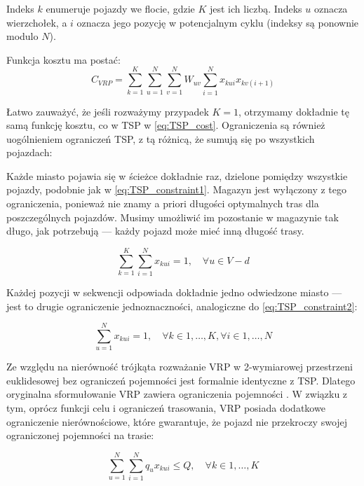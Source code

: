 Indeks $k$ enumeruje pojazdy we flocie, gdzie $K$ jest ich liczbą. Indeks $u$ oznacza wierzchołek, a $i$ oznacza jego pozycję w potencjalnym cyklu (indeksy są ponownie modulo $N$).

Funkcja kosztu ma postać:
\begin{equation}
C_{VRP} = \sum_{k=1}^K \sum_{u=1}^N \sum_{v=1}^N W_{uv} \sum_{i=1}^N x_{kui} x_{kv(i+1)}
\label{eq:VRP_cost}
\end{equation}

Łatwo zauważyć, że jeśli rozważymy przypadek $K=1$, otrzymamy dokładnie tę samą funkcję kosztu, co w TSP w \ref{eq:TSP_cost}. Ograniczenia są również uogólnieniem ograniczeń TSP, z tą różnicą, że sumują się po wszystkich pojazdach:

Każde miasto pojawia się w ścieżce dokładnie raz, dzielone pomiędzy wszystkie pojazdy, podobnie jak w \ref{eq:TSP_constraint1}. Magazyn jest wyłączony z tego ograniczenia, ponieważ nie znamy a priori długości optymalnych tras dla poszczególnych pojazdów. Musimy umożliwić im pozostanie w magazynie tak długo, jak potrzebują — każdy pojazd może mieć inną długość trasy.

\begin{equation}
\sum_{k=1}^{K} \sum_{i=1}^{N} x_{kui} = 1, \quad \forall u \in V - {d}
\label{eq:VRP_constraint1}
\end{equation}

Każdej pozycji w sekwencji odpowiada dokładnie jedno odwiedzone miasto — jest to drugie ograniczenie jednoznaczności, analogiczne do \ref{eq:TSP_constraint2}:

\begin{equation}
\sum_{u=1}^{N} x_{kui} = 1, \quad \forall k \in {1, \ldots, K}, \forall i \in {1, \ldots, N}
\label{eq:VRP_constraint2}
\end{equation}

Ze względu na nierówność trójkąta rozważanie VRP w 2-wymiarowej przestrzeni euklidesowej bez ograniczeń pojemności jest formalnie identyczne z TSP. Dlatego oryginalna sformułowanie VRP zawiera ograniczenia pojemności \cite{dantzig1959truck}. W związku z tym, oprócz funkcji celu i ograniczeń trasowania, VRP posiada dodatkowe ograniczenie nierównościowe, które gwarantuje, że pojazd nie przekroczy swojej ograniczonej pojemności na trasie:

\begin{equation}
\sum_{u=1}^{N} \sum_{i=1}^{N} q_u x_{kui} \le Q, \quad \forall k \in {1, \ldots, K}
\label{eq:VRP_constraint3}
\end{equation}

